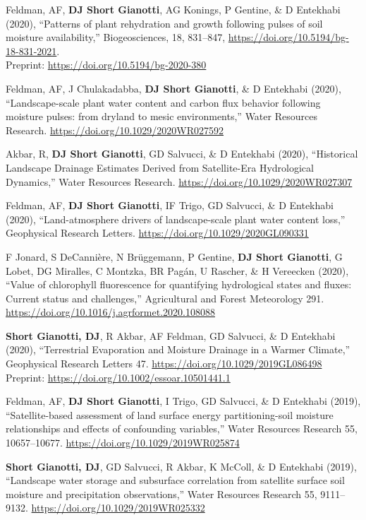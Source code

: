 \documentclass[10pt, a4paper]{article}
\newcommand{\lbr}{\vspace*{12pt}}
\newcommand{\years}[1]{\mbox{}\marginnote{\scriptsize #1}} %
\begin{document}
\years{2021a}Feldman, AF, \textbf{DJ Short Gianotti}, AG Konings, P Gentine, \& D Entekhabi (2020), ``Patterns of plant rehydration and growth following pulses of soil moisture availability,'' Biogeosciences, 18, 831–847, \url{https://doi.org/10.5194/bg-18-831-2021}. \\Preprint: \url{https://doi.org/10.5194/bg-2020-380}\lbr

\years{2020e}Feldman, AF, J Chulakadabba, \textbf{DJ Short Gianotti}, \& D Entekhabi (2020), ``Landscape-scale plant water content and carbon flux behavior following moisture pulses: from dryland to mesic environments,'' Water Resources Research. \url{https://doi.org/10.1029/2020WR027592}\lbr

\years{2020d}Akbar, R, \textbf{DJ Short Gianotti}, GD Salvucci, \& D Entekhabi (2020), ``Historical Landscape Drainage Estimates Derived from Satellite-Era Hydrological Dynamics,'' Water Resources Research. \url{https://doi.org/10.1029/2020WR027307}\lbr

\years{2020c}Feldman, AF, \textbf{DJ Short Gianotti}, IF Trigo, GD Salvucci, \& D Entekhabi (2020), ``Land-atmosphere drivers of landscape-scale plant water content loss,'' Geophysical Research Letters. \url{https://doi.org/10.1029/2020GL090331}\lbr

\years{2020b}F Jonard, S DeCanni\`ere, N Br\"uggemann, P Gentine, \textbf{DJ Short Gianotti}, G Lobet, DG Miralles, C Montzka, BR Pag\'an, U Rascher, \& H Vereecken (2020), ``Value of chlorophyll fluorescence for quantifying hydrological states and fluxes: Current status and challenges,'' Agricultural and Forest Meteorology 291. \url{https://doi.org/10.1016/j.agrformet.2020.108088} \lbr

\years{2020a}\textbf{Short Gianotti, DJ}, R Akbar, AF Feldman, GD Salvucci, \& D Entekhabi (2020), ``Terrestrial Evaporation and Moisture Drainage in a Warmer Climate,'' Geophysical Research Letters 47. \url{https://doi.org/10.1029/2019GL086498}\\ Preprint: \url{https://doi.org/10.1002/essoar.10501441.1}\lbr

\years{2019d}Feldman, AF, \textbf{DJ Short Gianotti}, I Trigo, GD Salvucci, \& D Entekhabi (2019), ``Satellite-based assessment of land surface energy partitioning-soil moisture relationships and effects of confounding variables,'' Water Resources Research 55, 10657--10677. \url{https://doi.org/10.1029/2019WR025874} \lbr

\years{2019c}\textbf{Short Gianotti, DJ}, GD Salvucci, R Akbar, K McColl, \& D Entekhabi (2019), ``Landscape water storage and subsurface correlation from satellite surface soil moisture and precipitation observations,'' Water Resources Research 55, 9111--9132. \url{https://doi.org/10.1029/2019WR025332} \lbr
\end{document}
